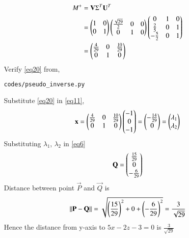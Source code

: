 \documentclass[journal,12pt,twocolumn]{IEEEtran}
\begin{document}
\begin{align}
	\label{eq18}M^{+} &= \mathbf{V}\Sigma^T\mathbf{U}^T\\
	\label{eq19}&= \begin{pmatrix}1 & 0\\0 & 1\end{pmatrix}\begin{pmatrix}\frac{\sqrt{29}}{2} & 0 & 0\\0 & 1 & 0\end{pmatrix}\begin{pmatrix}0 & 1 & 0\\\frac{2}{5} & 0 & 1\\-\frac{5}{2} & 0 & 1\end{pmatrix}\\
	\label{eq20}&=\begin{pmatrix}\frac{4}{29} & 0 & \frac{10}{29}\\0 & 1 & 0\end{pmatrix}
\end{align}
Verify \eqref{eq20} from,
\begin{lstlisting}
codes/pseudo_inverse.py
\end{lstlisting}
Substitute \eqref{eq20} in \eqref{eq11},
\begin{align}
	\mathbf{x} = \begin{pmatrix}\frac{4}{29} & 0 & \frac{10}{29}\\0 & 1 & 0\end{pmatrix}\begin{pmatrix}-1\\0\\-1\end{pmatrix} = \begin{pmatrix}-\frac{14}{29}\\0\end{pmatrix} = \begin{pmatrix}\lambda_1 \\ \lambda_2\end{pmatrix}
\end{align}
Substituting $\lambda_1$, $\lambda_2$ in \eqref{eq6}
\begin{equation}
	\mathbf{Q} = \begin{pmatrix}\frac{15}{29}\\0\\-\frac{6}{29}\end{pmatrix}
\end{equation}
Distance between point $\vec{P}$ and $\vec{Q}$ is
\begin{align}
	\left\lVert\mathbf{P}-\mathbf{Q}\right\rVert = \sqrt{\left(\frac{15}{29}\right)^2 + 0 + \left(-\frac{6}{29}\right)^2} = \frac{3}{\sqrt{29}}
\end{align}
Hence the distance from y-axis to $5x - 2z - 3 = 0$ is $\frac{3}{\sqrt{29}}$
\end{document}

